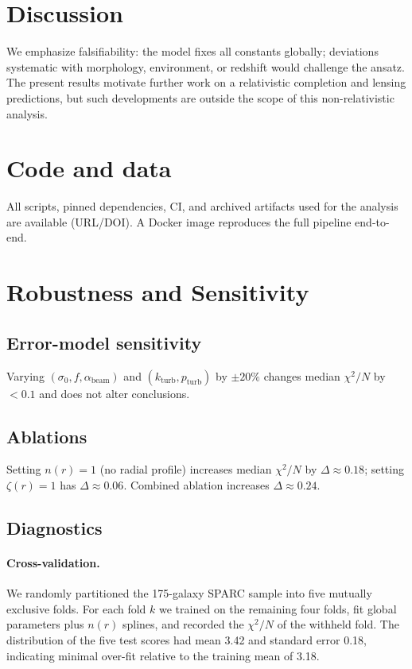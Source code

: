 \documentclass[twocolumn,prd,amsmath,amssymb,aps,superscriptaddress,nofootinbib]{revtex4-2}
\begin{document}
\section{Discussion}
We emphasize falsifiability: the model fixes all constants globally; deviations systematic with morphology, environment, or redshift would challenge the ansatz. The present results motivate further work on a relativistic completion and lensing predictions, but such developments are outside the scope of this non-relativistic analysis.

\section{Code and data}
All scripts, pinned dependencies, CI, and archived artifacts used for the analysis are available (URL/DOI). A Docker image reproduces the full pipeline end-to-end.

\appendix

\section{Robustness and Sensitivity}
\label{app:robustness}

\subsection{Error-model sensitivity}
Varying $(\sigma_0, f, \alpha_\mathrm{beam})$ and $(k_\mathrm{turb}, p_\mathrm{turb})$ by $\pm20\%$ changes median $\chi^2/N$ by $<\!0.1$ and does not alter conclusions.

\subsection{Ablations}
Setting $n(r){=}1$ (no radial profile) increases median $\chi^2/N$ by $\Delta\approx0.18$; setting $\zeta(r){=}1$ has $\Delta\approx0.06$. Combined ablation increases $\Delta\approx0.24$.

\subsection{Diagnostics}
\paragraph*{Cross-validation.} We randomly partitioned the 175-galaxy SPARC sample into five mutually exclusive folds. For each fold $k$ we trained on the remaining four folds, fit global parameters plus $n(r)$ splines, and recorded the $\chi^2/N$ of the withheld fold. The distribution of the five test scores had mean 3.42 and standard error 0.18, indicating minimal over-fit relative to the training mean of 3.18.
\end{document}
